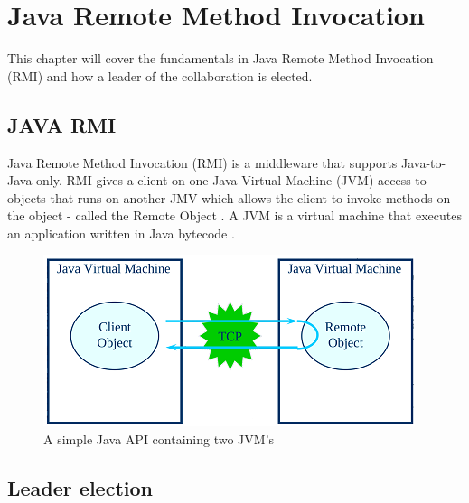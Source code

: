 \documentclass[Main]{subfiles}
\begin{document}
\chapter{Java Remote Method Invocation}
This chapter will cover the fundamentals in Java Remote Method Invocation (RMI) and how a leader of the collaboration is elected.

\section{JAVA RMI}
Java Remote Method Invocation (RMI) is a middleware that supports Java-to-Java only. RMI gives a client on one Java Virtual Machine (JVM) access to objects that runs on another JMV which allows the client to invoke methods on the object - called the Remote Object \cite{RMI-slides}. A JVM is a virtual machine that executes an application written in Java bytecode \cite{wiki-jvm}.

\begin{figure}[H]
\centering
\includegraphics[scale=1]{Figurer/JVM.png}
\caption{A simple Java API containing two JVM's \cite{RMI-slides}}
\end{figure}


\section{Leader election}
\end{document}
